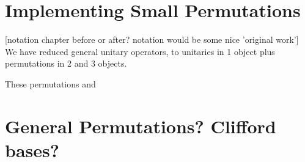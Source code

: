 \section{Implementing Small Permutations}
[notation chapter before or after? notation would be some nice 'original work']
We have reduced general unitary operators, to unitaries in 1 object plus permutations in 2 and 3 objects.

These permutations and 

\section{General Permutations? Clifford bases?}
